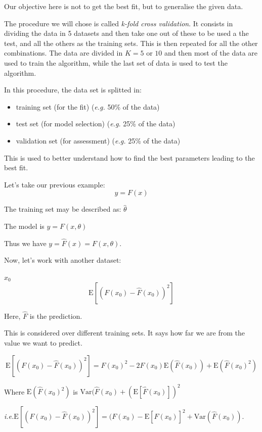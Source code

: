 \documentclass[a4paper]{tufte-book}
\newcommand{\hairsp}{\hspace{1pt}}%
\newcommand{\ie}{\textit{i.\hairsp{}e.}\xspace}
\newcommand{\eg}{\textit{e.\hairsp{}g.}\xspace}
\newcommand{\E}{\mathrm{E}}
\newcommand{\var}{\mathrm{Var}}
\begin{document}
Our objective here is not to get the best fit, but to generalise the given data.

The procedure we will chose is called \emph{k-fold cross validation}. It
consists in dividing the data in 5 datasets and then take one out of these to
be used a the test, and all the others as the training sets.
This is then repeated for all the other combinations. The data are divided in
$K=5$ or $10$ and then most of the data are used to train the algorithm, while
the last set of data is used to test the algorithm.

In this procedure, the data set is splitted in:
\begin{itemize}
    \item training set (for the fit) (\eg 50\% of the data)
    \item test set (for model selection) (\eg 25\% of the data)
    \item validation set (for assessment) (\eg 25\% of the data)
\end{itemize}

This is used to better understand how to find the best parameters leading to the
best fit.

Let's take our previous example:
\begin{equation}
    y=F(x)
\end{equation}

The training set may be described as: $\hat{\theta}$

The model is $y=F(x,\theta)$

Thus we have $y= \hat{F}(x) = F(x,\theta)$.

Now, let's work with another dataset:

$x_0$
\begin{equation}
    \E [(F(x_0) - \hat{F}(x_0) )^2]
\end{equation}
 
Here, $\hat F$ is the prediction.

This is considered over different training sets. It says how far we are from the
value we want to predict.

\begin{equation}
    \E[(F(x_0) - \hat{F}(x_0) )^2] = F(x_0)^2 - 2F(x_0) \E (\hat{F}(x_0)) + \E (\hat{F}(x_0)^2)
\end{equation}

Where $\E (\hat{F}(x_0)^2)$ is $\var(\hat{F}(x_0) + (\E[\hat{F}(x_0)])^2$

\ie $\E[(F(x_0) - \hat{F}(x_0) )^2] = (F(x_0) - \E[\hat{F}(x_0)]^2 + \var(\hat{F}(x_0))$.
\end{document}
